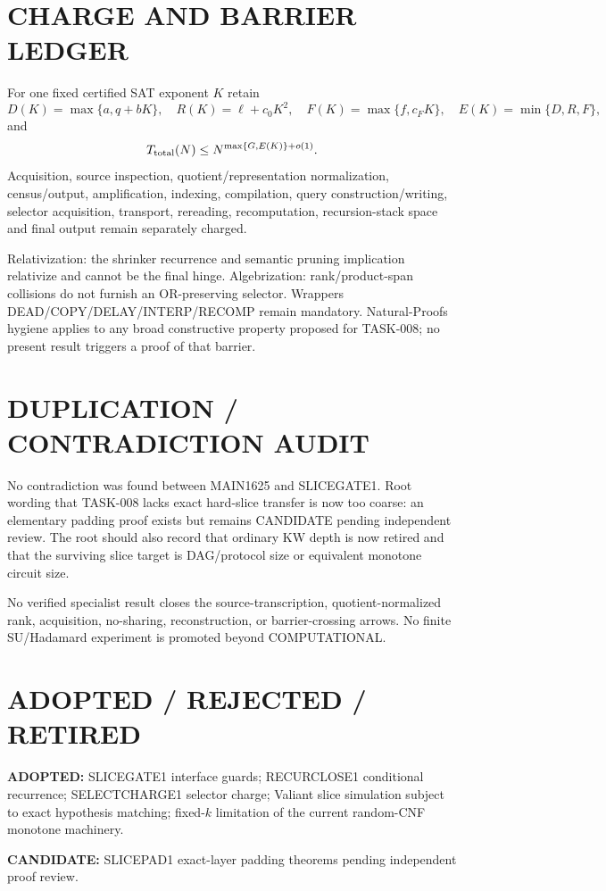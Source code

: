 \documentclass[11pt]{article}
\begin{document}
\section*{CHARGE AND BARRIER LEDGER}
For one fixed certified SAT exponent $K$ retain
\[
D(K)=\max\{a,q+bK\},\quad R(K)=\ell+c_0K^2,\quad F(K)=\max\{f,c_FK\},\quad E(K)=\min\{D,R,F\},
\]
and
\[
T_{\rm total}(N)\le N^{\max\{G,E(K)\}+o(1)}.
\]
Acquisition, source inspection, quotient/representation normalization, census/output, amplification, indexing, compilation, query construction/writing, selector acquisition, transport, rereading, recomputation, recursion-stack space and final output remain separately charged.

Relativization: the shrinker recurrence and semantic pruning implication relativize and cannot be the final hinge. Algebrization: rank/product-span collisions do not furnish an OR-preserving selector. Wrappers DEAD/COPY/DELAY/INTERP/RECOMP remain mandatory. Natural-Proofs hygiene applies to any broad constructive property proposed for TASK-008; no present result triggers a proof of that barrier.

\section*{DUPLICATION / CONTRADICTION AUDIT}
No contradiction was found between MAIN1625 and SLICEGATE1. Root wording that TASK-008 lacks exact hard-slice transfer is now too coarse: an elementary padding proof exists but remains CANDIDATE pending independent review. The root should also record that ordinary KW depth is now retired and that the surviving slice target is DAG/protocol size or equivalent monotone circuit size.

No verified specialist result closes the source-transcription, quotient-normalized rank, acquisition, no-sharing, reconstruction, or barrier-crossing arrows. No finite SU/Hadamard experiment is promoted beyond COMPUTATIONAL.

\section*{ADOPTED / REJECTED / RETIRED}
\textbf{ADOPTED:} SLICEGATE1 interface guards; RECURCLOSE1 conditional recurrence; SELECTCHARGE1 selector charge; Valiant slice simulation subject to exact hypothesis matching; fixed-$k$ limitation of the current random-CNF monotone machinery.

\textbf{CANDIDATE:} SLICEPAD1 exact-layer padding theorems pending independent proof review.
\end{document}
